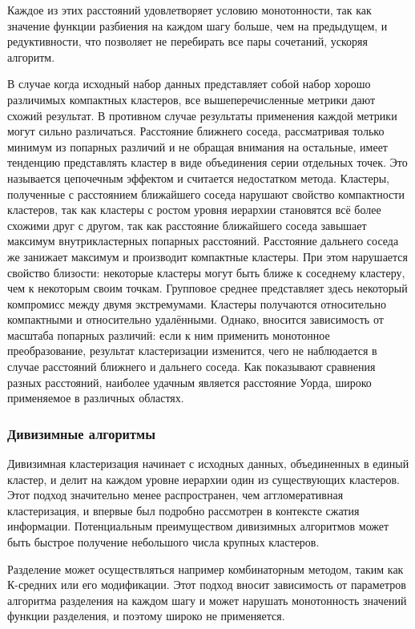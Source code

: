 Каждое из этих расстояний удовлетворяет условию монотонности, так как значение функции разбиения на каждом шагу больше, чем на предыдущем, и редуктивности, что позволяет не перебирать все пары сочетаний, ускоряя алгоритм.

В случае когда исходный набор данных представляет собой набор хорошо различимых компактных кластеров, все вышеперечисленные метрики дают схожий результат. В противном случае результаты применения каждой метрики могут сильно различаться. Расстояние ближнего соседа, рассматривая только минимум из попарных различий и не обращая внимания на остальные, имеет тенденцию представлять кластер в виде объединения серии отдельных точек. Это называется цепочечным эффектом и считается недостатком метода. Кластеры, полученные с расстоянием ближайшего соседа нарушают свойство компактности кластеров, так как кластеры с ростом уровня иерархии становятся всё более схожими друг с другом, так как расстояние ближайшего соседа завышает максимум внутрикластерных попарных расстояний. Расстояние дальнего соседа же занижает максимум и производит компактные кластеры. При этом нарушается свойство близости: некоторые кластеры могут быть ближе к соседнему кластеру, чем к некоторым своим точкам. Групповое среднее представляет здесь некоторый компромисс между двумя экстремумами. Кластеры получаются относительно компактными и относительно удалёнными. Однако, вносится зависимость от масштаба попарных различий: если к ним применить монотонное преобразование, результат кластеризации изменится, чего не наблюдается в случае расстояний ближнего и дальнего соседа. Как показывают сравнения разных расстояний, наиболее удачным является расстояние Уорда, широко применяемое в различных областях. 

\subsubsection{Дивизимные алгоритмы}

Дивизимная кластеризация начинает с исходных данных, объединенных в единый кластер, и делит на каждом уровне иерархии один из существующих кластеров. Этот подход значительно менее распространен, чем аггломеративная кластеризация, и впервые был подробно рассмотрен в контексте сжатия информации. Потенциальным преимуществом дивизимных алгоритмов может быть быстрое получение небольшого числа крупных кластеров.

Разделение может осуществляться например комбинаторным методом, таким как К-средних или его модификации. Этот подход вносит зависимость от параметров алгоритма разделения на каждом шагу и может нарушать монотонность значений функции разделения, и поэтому широко не применяется. 

